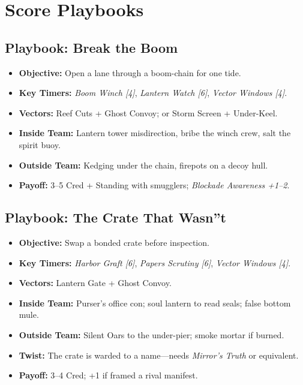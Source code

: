 \documentclass[11pt,oneside]{book}
\begin{document}
\section{Score Playbooks}

\subsection*{Playbook: Break the Boom}
\begin{itemize}
  \item \textbf{Objective:} Open a lane through a boom-chain for one tide.
  \item \textbf{Key Timers:} \emph{Boom Winch [4]}, \emph{Lantern Watch [6]}, \emph{Vector Windows [4]}.
  \item \textbf{Vectors:} Reef Cuts + Ghost Convoy; or Storm Screen + Under-Keel.
  \item \textbf{Inside Team:} Lantern tower misdirection, bribe the winch crew, salt the spirit buoy.
  \item \textbf{Outside Team:} Kedging under the chain, firepots on a decoy hull.
  \item \textbf{Payoff:} 3--5 Cred + Standing with smugglers; \emph{Blockade Awareness +1--2}.
\end{itemize}

\subsection*{Playbook: The Crate That Wasn''t}
\begin{itemize}
  \item \textbf{Objective:} Swap a bonded crate before inspection.
  \item \textbf{Key Timers:} \emph{Harbor Graft [6]}, \emph{Papers Scrutiny [6]}, \emph{Vector Windows [4]}.
  \item \textbf{Vectors:} Lantern Gate + Ghost Convoy.
  \item \textbf{Inside Team:} Purser's office con; soul lantern to read seals; false bottom mule.
  \item \textbf{Outside Team:} Silent Oars to the under-pier; smoke mortar if burned.
  \item \textbf{Twist:} The crate is warded to a name---needs \emph{Mirror's Truth} or equivalent.
  \item \textbf{Payoff:} 3--4 Cred; +1 if framed a rival manifest.
\end{itemize}
\end{document}
